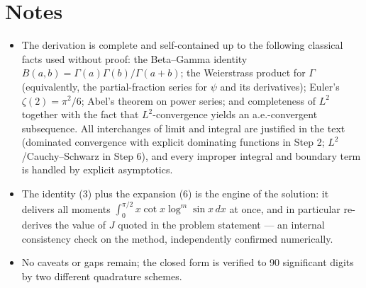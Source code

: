 \documentclass[11pt]{article}
\theoremstyle{remark}
\begin{document}
\section*{Notes}

\begin{itemize}
\item The derivation is complete and self-contained up to the following classical facts used without proof: the Beta--Gamma identity $B(a,b)=\Gamma(a)\Gamma(b)/\Gamma(a+b)$; the Weierstrass product for $\Gamma$ (equivalently, the partial-fraction series for $\psi$ and its derivatives); Euler's $\zeta(2)=\pi^{2}/6$; Abel's theorem on power series; and completeness of $L^{2}$ together with the fact that $L^{2}$-convergence yields an a.e.-convergent subsequence. All interchanges of limit and integral are justified in the text (dominated convergence with explicit dominating functions in Step 2; $L^{2}$/Cauchy--Schwarz in Step 6), and every improper integral and boundary term is handled by explicit asymptotics.
\item The identity (3) plus the expansion (6) is the engine of the solution: it delivers all moments $\int_0^{\pi/2}x\cot x\log^{m}\sin x\,dx$ at once, and in particular re-derives the value of $J$ quoted in the problem statement --- an internal consistency check on the method, independently confirmed numerically.
\item No caveats or gaps remain; the closed form is verified to 90 significant digits by two different quadrature schemes.
\end{itemize}
\end{document}

